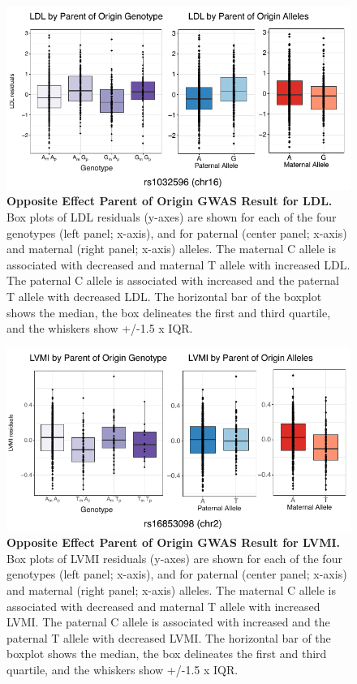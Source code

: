 \begin{figure}[!htb]
\centering
\includegraphics[width=5in]{img/ch02/fig-s8.pdf}
\caption[Opposite Effect Parent of Origin GWAS Result for LDL.]{\textbf{Opposite Effect Parent of Origin GWAS Result for LDL.}  Box plots of LDL residuals (y-axes) are shown for each of the four genotypes (left panel; x-axis), and for paternal (center panel; x-axis) and maternal (right panel; x-axis) alleles. The maternal C allele is associated with decreased and maternal T allele with increased LDL. The paternal C allele is associated with increased and the paternal T allele with decreased LDL. The horizontal bar of the boxplot shows the median, the box delineates the first and third quartile, and the whiskers show +/-1.5 x IQR.}
\label{fig:fig-s8}
\end{figure}

\begin{figure}[!htb]
\centering
\includegraphics[width=5in]{img/ch02/fig-s9.pdf}
\caption[Opposite Effect Parent of Origin GWAS Result for LVMI.]{\textbf{Opposite Effect Parent of Origin GWAS Result for LVMI.}  Box plots of LVMI residuals (y-axes) are shown for each of the four genotypes (left panel; x-axis), and for paternal (center panel; x-axis) and maternal (right panel; x-axis) alleles. The maternal C allele is associated with decreased and maternal T allele with increased LVMI. The paternal C allele is associated with increased and the paternal T allele with decreased LVMI. The horizontal bar of the boxplot shows the median, the box delineates the first and third quartile, and the whiskers show +/-1.5 x IQR.}
\label{fig:fig-s9}
\end{figure}

